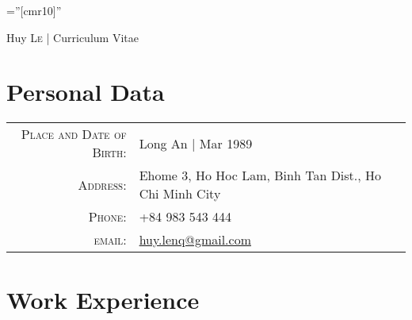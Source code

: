 \documentclass[a4paper,10pt]{article}
\begin{document}

\pagestyle{empty} %

\font\fb=''[cmr10]'' %

\par{\centering
		{\Huge Huy \textsc{Le} | Curriculum Vitae
	}\bigskip\par}

\section{Personal Data}

\begin{tabular}{rl}
    \textsc{Place and Date of Birth:} & Long An | Mar 1989 \\
    \textsc{Address:}   & Ehome 3, Ho Hoc Lam, Binh Tan Dist., Ho Chi Minh City\\
    \textsc{Phone:}     & +84 983 543 444\\
    \textsc{email:}     & \href{mailto:huy.lenq@gmail.com}{huy.lenq@gmail.com}
\end{tabular}

\section{Work Experience}
\end{document}
